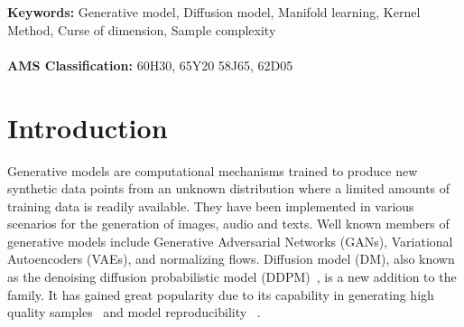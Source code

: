 \documentclass{article}
\begin{document}
\textbf{Keywords:} Generative model, Diffusion model,  Manifold learning, Kernel Method, Curse of dimension, Sample complexity
\\
\\
\textbf{AMS Classification:} 60H30, 65Y20
58J65, 62D05



\section{Introduction}
Generative models are computational mechanisms trained to produce new synthetic data points from an unknown distribution where a limited amounts of training data is readily available. 
They have been implemented in various scenarios for the generation of images, audio and texts. 
Well known members of generative models include 
Generative Adversarial Networks (GANs), Variational Autoencoders (VAEs), and normalizing flows. Diffusion model (DM), also known as the denoising diffusion probabilistic model (DDPM)~\cite{ho2020denoising}, is a new addition to the family. It has gained great popularity due to its capability in generating high quality samples~\cite{dhariwal2021diffusion} and model reproducibility ~\cite{zhang2023emergence}. 
\end{document}
